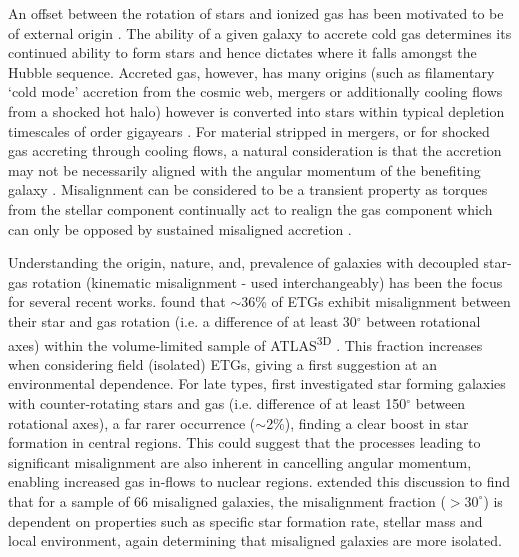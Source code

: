 An offset between the rotation of stars and ionized gas has been motivated to be of external origin \citep[see;][]{sarzi2006,davis2011a}. The ability of a given galaxy to accrete cold gas determines its continued ability to form stars and hence dictates where it falls amongst the Hubble sequence. Accreted gas, however, has many origins (such as filamentary `cold mode' accretion from the cosmic web, mergers or additionally cooling flows from a shocked hot halo) however is converted into stars within typical depletion timescales of order gigayears \citep{davis2016}. 
For material stripped in mergers, or for shocked gas accreting through cooling flows, a natural consideration is that the accretion may not be necessarily aligned with the angular momentum of the benefiting galaxy \citep[e.g.][]{davis2011, lagos2015}. Misalignment can be considered to be a transient property as torques from the stellar component continually act to realign the gas component which can only be opposed by sustained misaligned accretion \citep[][]{vdvoort2015, davis2016}. 

Understanding the origin, nature, and, prevalence of galaxies with decoupled star-gas rotation (kinematic misalignment - used interchangeably) has been the focus for several recent works. \citet{davis2011a} found that $\sim 36$\% of ETGs exhibit misalignment between their star and gas rotation (i.e. a difference of at least 30$^{\circ}$ between rotational axes) within the volume-limited sample of ATLAS\textsuperscript{3D} \citep{atlas3d}. This fraction increases when considering field (isolated) ETGs, giving a first suggestion at an environmental dependence. For late types, \citet{chen2016} first investigated star forming galaxies with counter-rotating stars and gas (i.e. difference of at least 150$^{\circ}$ between rotational axes), a far rarer occurrence ($\sim$2\%), finding a clear boost in star formation in central regions. This could suggest that the processes leading to significant misalignment are also inherent in cancelling angular momentum, enabling increased gas in-flows to nuclear regions. \citet{jin2016} extended this discussion to find that for a sample of 66 misaligned galaxies, the misalignment fraction ($> 30^{\circ}$) is dependent on properties such as specific star formation rate, stellar mass and local environment, again determining that misaligned galaxies are more isolated. 

